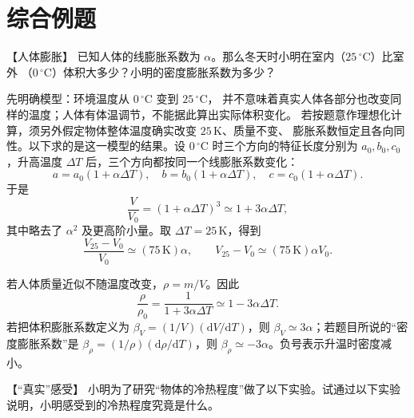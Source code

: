 {
\section{综合例题}
\begin{origexamplebox}{【人体膨胀】}\label{ch14:ex:s28-19-1}
已知人体的线膨胀系数为 $\alpha$。那么冬天时小明在室内（$25\,{}^\circ\mathrm C$）比室外
（$0\,{}^\circ\mathrm C$）体积大多少？小明的密度膨胀系数为多少？

\ThQExpansion
\end{origexamplebox}

\begin{xesolution}
\ThAExpansion

先明确模型：环境温度从 $0\,{}^\circ\mathrm C$ 变到 $25\,{}^\circ\mathrm C$，
并不意味着真实人体各部分也改变同样的温度；人体有体温调节，不能据此算出实际体积变化。
若按题意作理想化计算，须另外假定物体整体温度确实改变 $25\,\mathrm K$、质量不变、
膨胀系数恒定且各向同性。以下求的是这一模型的结果。设 $0\,{}^\circ\mathrm C$ 时三个方向的特征长度分别为
$a_0,b_0,c_0$，升高温度 $\Delta T$ 后，三个方向都按同一个线膨胀系数变化：
\begin{equation}
  a=a_0(1+\alpha\Delta T),\quad
  b=b_0(1+\alpha\Delta T),\quad
  c=c_0(1+\alpha\Delta T).
\end{equation}
于是
\begin{equation}
  \frac{V}{V_0}=(1+\alpha\Delta T)^3
  \simeq 1+3\alpha\Delta T,
\end{equation}
其中略去了 $\alpha^2$ 及更高阶小量。取 $\Delta T=25\,\mathrm K$，得到
\begin{equation}
  \boxed{\frac{V_{25}-V_0}{V_0}\simeq(75\,\mathrm K)\alpha},
  \qquad
  \boxed{V_{25}-V_0\simeq(75\,\mathrm K)\alpha V_0}.
\end{equation}

若人体质量近似不随温度改变，$\rho=m/V$。因此
\begin{equation}
  \frac{\rho}{\rho_0}=\frac{1}{1+3\alpha\Delta T}
  \simeq1-3\alpha\Delta T.
\end{equation}
若把体积膨胀系数定义为 $\beta_V=(1/V)(\mathrm dV/\mathrm dT)$，则
$\boxed{\beta_V\simeq3\alpha}$；若题目所说的“密度膨胀系数”是
$\beta_\rho=(1/\rho)(\mathrm d\rho/\mathrm dT)$，则
$\boxed{\beta_\rho\simeq-3\alpha}$。负号表示升温时密度减小。
\end{xesolution}

\begin{origexamplebox}{【“真实”感受】}\label{ch14:ex:s28-19-2}
小明为了研究“物体的冷热程度”做了以下实验。试通过以下实验说明，小明感受到的冷热程度究竟是什么。


\end{origexamplebox}}
